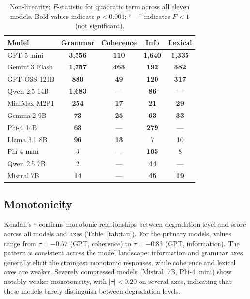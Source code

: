 \documentclass[11pt]{article}
\begin{document}
\begin{table}[H]
\centering
\caption{Non-linearity: $F$-statistic for quadratic term across all eleven models. Bold values indicate $p < 0.001$; ``---'' indicates $F < 1$ (not significant).}
\label{tab:nonlin}
\small
\begin{tabular}{@{}lcccc@{}}
\toprule
\textbf{Model} & \textbf{Grammar} & \textbf{Coherence} & \textbf{Info} & \textbf{Lexical} \\
\midrule
GPT-5 mini & \textbf{3{,}556} & \textbf{110} & \textbf{1{,}640} & \textbf{1{,}335} \\
Gemini 3 Flash & \textbf{1{,}757} & \textbf{463} & \textbf{192} & \textbf{382} \\
GPT-OSS 120B & \textbf{880} & \textbf{49} & \textbf{120} & \textbf{317} \\
Qwen 2.5 14B & \textbf{1{,}683} & --- & \textbf{86} & --- \\
MiniMax M2P1 & \textbf{254} & \textbf{17} & \textbf{21} & \textbf{29} \\
Gemma 2 9B & \textbf{73} & \textbf{25} & \textbf{63} & \textbf{33} \\
Phi-4 14B & \textbf{63} & --- & \textbf{279} & --- \\
Llama 3.1 8B & \textbf{96} & \textbf{13} & 7 & 10 \\
Phi-4 mini & 3 & --- & \textbf{105} & 8 \\
Qwen 2.5 7B & 2 & --- & \textbf{44} & --- \\
Mistral 7B & \textbf{14} & --- & \textbf{45} & \textbf{19} \\
\bottomrule
\end{tabular}
\end{table}

\subsection{Monotonicity}

Kendall's $\tau$ confirms monotonic relationships between degradation level and score across all models and axes (Table~\ref{tab:tau}). For the primary models, values range from $\tau = -0.57$ (GPT, coherence) to $\tau = -0.83$ (GPT, information). The pattern is consistent across the model landscape: information and grammar axes generally elicit the strongest monotonic responses, while coherence and lexical axes are weaker. Severely compressed models (Mistral~7B, Phi-4~mini) show notably weaker monotonicity, with $|\tau| < 0.20$ on several axes, indicating that these models barely distinguish between degradation levels.
\end{document}
